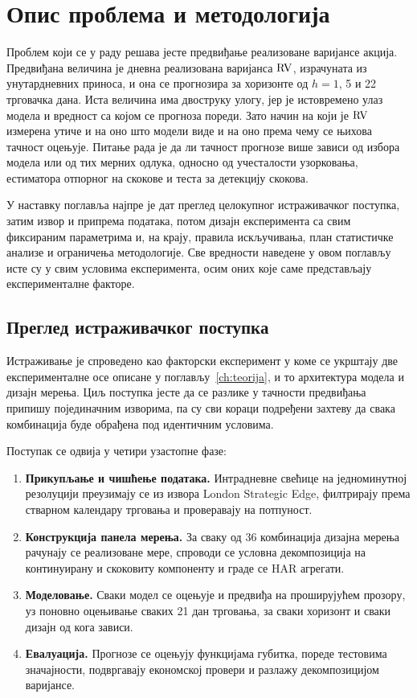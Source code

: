 \chapter{Опис проблема и методологија}
\label{ch:metodologija}

Проблем који се у раду решава јесте предвиђање реализоване варијансе акција.
Предвиђана величина је дневна реализована варијанса $\mathrm{RV}$, израчуната из унутардневних
приноса, и она се прогнозира за хоризонте од $h = 1$, 5 и 22 трговачка дана. Иста
величина има двоструку улогу, јер је истовремено улаз модела и вредност са којом се
прогноза пореди. Зато начин на који је $\mathrm{RV}$ измерена утиче и на оно што модели виде и
на оно према чему се њихова тачност оцењује. Питање рада је да ли тачност прогнозе
више зависи од избора модела или од тих мерних одлука, односно од учесталости
узорковања, естиматора отпорног на скокове и теста за детекцију скокова.

У наставку поглавља најпре је дат преглед целокупног истраживачког поступка, затим
извор и припрема података, потом дизајн експеримента са свим фиксираним параметрима и,
на крају, правила искључивања, план статистичке анализе и ограничења методологије. Све
вредности наведене у овом поглављу исте су у свим условима експеримента, осим оних које
саме представљају експерименталне факторе.

\section{Преглед истраживачког поступка}

Истраживање је спроведено као факторски експеримент у коме се укрштају две
експерименталне осе описане у поглављу~\ref{ch:teorija}, и то архитектура модела и
дизајн мерења. Циљ поступка јесте да се разлике у тачности предвиђања припишу појединачним
изворима, па су сви кораци подређени захтеву да свака комбинација буде обрађена под
идентичним условима.

Поступак се одвија у четири узастопне фазе:

\begin{enumerate}
\item \textbf{Прикупљање и чишћење података.} Интрадневне свећице на једноминутној
      резолуцији преузимају се из извора London Strategic Edge, филтрирају према
      стварном календару трговања и проверавају на потпуност.
\item \textbf{Конструкција панела мерења.} За сваку од 36 комбинација
      дизајна мерења рачунају се реализоване мере, спроводи се условна декомпозиција
      на континуирану и скоковиту компоненту и граде се HAR агрегати.
\item \textbf{Моделовање.} Сваки модел се оцењује и предвиђа на проширујућем прозору,
      уз поновно оцењивање сваких 21 дан трговања, за сваки хоризонт и сваки дизајн од
      кога зависи.
\item \textbf{Евалуација.} Прогнозе се оцењују функцијама губитка, пореде тестовима
      значајности, подвргавају економској провери и разлажу декомпозицијом варијансе.
\end{enumerate}

